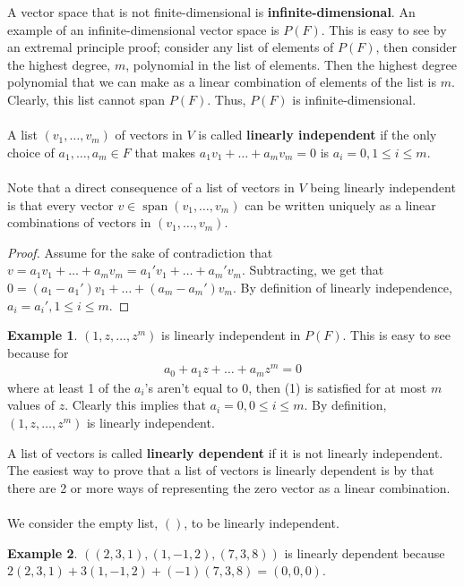 \documentclass{article}
\DeclareMathOperator{\Span}{span}
\theoremstyle{definition}
\newtheorem{ex}{Example}[section]
\begin{document}
A vector space that is not finite-dimensional is \textbf{infinite-dimensional}. An example of an infinite-dimensional vector space is $P(F)$. This is easy to see by an extremal principle proof; consider any list of elements of $P(F)$, then consider the highest degree, $m$, polynomial in the list of elements. Then the highest degree polynomial that we can make as a linear combination of elements of the list is $m$. Clearly, this list cannot span $P(F)$. Thus, $P(F)$ is infinite-dimensional. \\ \\
A list $(v_1 , \dots, v_m)$ of vectors in $V$ is called \textbf{linearly independent} if the only choice of $a_1, \dots,a_m \in F$ that makes $a_1v_1 + \dots + a_mv_m = 0$ is $a_i = 0, 1 \leq i \leq m$. \\ \\
Note that a direct consequence of a list of vectors in $V$ being linearly independent is that every vector $v \in \Span(v_1 , \dots, v_m)$ can be written uniquely as a linear combinations of vectors in $(v_1 , \dots, v_m)$. \begin{proof}
Assume for the sake of contradiction that $v = a_1v_1 + \dots + a_mv_m = a_1'v_1 + \dots + a_m'v_m$. Subtracting, we get that $0 = (a_1 - a_1')v_1 + \dots + (a_m - a_m')v_m$. By definition of linearly independence, $a_i = a_i', 1 \leq i \leq m$.
\end{proof}
\begin{ex}
$(1, z, \dots , z^m)$ is linearly independent in $P(F)$. This is easy to see because for \begin{align}
a_0 + a_1z + \dots + a_mz^m = 0
\end{align} where at least 1 of the $a_i$'s aren't equal to 0, then (1) is satisfied for at most $m$ values of $z$. Clearly this implies that $a_i = 0, 0 \leq i \leq m$. By definition, $(1, z, \dots , z^m)$ is linearly independent.
\end{ex} $ $ \\
A list of vectors is called \textbf{linearly dependent} if it is not linearly independent. The easiest way to prove that a list of vectors is linearly dependent is by that there are 2 or more ways of representing the zero vector as a linear combination. \\ \\
We consider the empty list, $()$, to be linearly independent.
\begin{ex}
$((2, 3, 1), (1, -1, 2), (7, 3, 8))$ is linearly dependent because \\ $2(2, 3, 1) + 3(1, -1, 2) + (-1)(7, 3, 8) = (0, 0, 0)$.
\end{ex}
\end{document}
